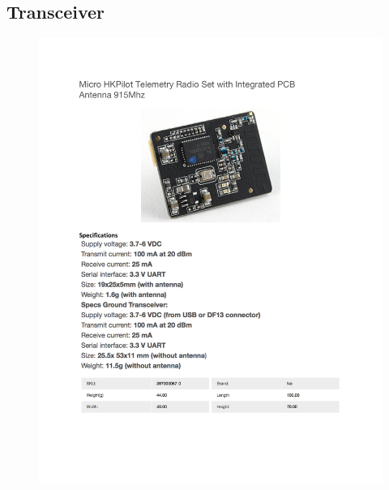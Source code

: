 \documentclass[../main.tex]{subfiles}
\begin{document}
\subsection{Transceiver \cite{Transceiver}} \label{transceiver}
\begin{figure}[H]
	\centering
	\includegraphics[width=\textwidth]{img/specs/transceiver.pdf}
\end{figure}

\end{document}
